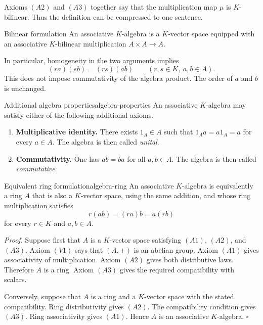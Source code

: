 \documentclass[10pt,a4paper]{article}
\begin{document}
Axioms $(A2)$ and $(A3)$ together say that the multiplication map $\mu$ is
$K$-bilinear. Thus the definition can be compressed to one sentence.

\begin{summarybox}{Bilinear formulation}
An associative $K$-algebra is a $K$-vector space equipped with an associative
$K$-bilinear multiplication $A\times A\to A$.
\end{summarybox}

In particular, homogeneity in the two arguments implies
\[
  (ra)(sb)=(rs)(ab)
  \qquad (r,s\in K,\ a,b\in A).
\]
This does not impose commutativity of the algebra product. The order of $a$
and $b$ is unchanged.

\begin{definition}{Additional algebra properties}{algebra-properties}
An associative $K$-algebra may satisfy either of the following additional
axioms.
\begin{enumerate}[label=\textup{(A\arabic*)},start=4]
  \item \textbf{Multiplicative identity.} There exists $1_A\in A$ such that
  $1_Aa=a1_A=a$ for every $a\in A$. The algebra is then called \emph{unital}.

  \item \textbf{Commutativity.} One has $ab=ba$ for all $a,b\in A$. The
  algebra is then called \emph{commutative}.
\end{enumerate}
\end{definition}

\begin{proposition}{Equivalent ring formulation}{algebra-ring}
An associative $K$-algebra is equivalently a ring $A$ that is also a
$K$-vector space, using the same addition, and whose ring multiplication
satisfies
\[
  r(ab)=(ra)b=a(rb)
\]
for every $r\in K$ and $a,b\in A$.
\end{proposition}

\textit{Proof.}
Suppose first that $A$ is a $K$-vector space satisfying $(A1)$, $(A2)$, and
$(A3)$. Axiom $(V1)$ says that $(A,+)$ is an abelian group. Axiom $(A1)$ gives
associativity of multiplication. Axiom $(A2)$ gives both distributive laws.
Therefore $A$ is a ring. Axiom $(A3)$ gives the required compatibility with
scalars.

Conversely, suppose that $A$ is a ring and a $K$-vector space with the stated
compatibility. Ring distributivity gives $(A2)$. The compatibility condition
gives $(A3)$. Ring associativity gives $(A1)$. Hence $A$ is an associative
$K$-algebra.
\hfill$\square$
\end{document}
